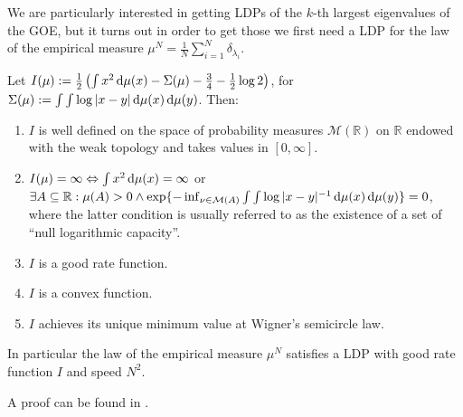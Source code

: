 We are particularly interested in getting LDPs of the $k$-th largest eigenvalues of the GOE, but it turns out in order to get those we first need a LDP for the law of the empirical measure $\mu^N=\frac{1}{N}\sum_{i=1}^N\delta_{\lambda_i}$.

\begin{theorem}\label{thm:LDPforWSCL}
	Let $I(\mu):=\frac{1}{2}\left(\int x^2\mathop{}\!\mathrm{d}\mu(x) - \Sigma(\mu) - \frac{3}{4}-\frac{1}{2}\log 2 \right)$, for $\Sigma(\mu):=\int\int\log|x-y|\mathop{}\!\mathrm{d}\mu(x)\mathop{}\!\mathrm{d}\mu(y)$. Then:
	\begin{enumerate}
		\item $I$ is well defined on the space of probability measures $\mathcal M(\mathbb{R})$ on $\mathbb{R}$ endowed with the weak topology and takes values in $[0,\infty]$.
		\item $I(\mu)=\infty \Leftrightarrow \int x^2\mathop{}\!\mathrm{d}\mu(x)=\infty$ or $\exists A\subseteq\mathbb R: \mu(A)>0 \land \exp\{-\inf_{\nu\in\mathcal M(A)}\int\int \log|x-y|^{-1}\mathop{}\!\mathrm{d}\mu(x)\mathop{}\!\mathrm{d}\mu(y)\}=0$, where the latter condition is usually referred to as the existence of a set of ``null logarithmic capacity''.
		\item $I$ is a good rate function.
		\item $I$ is a convex function.
		\item $I$ achieves its unique minimum value at Wigner's semicircle law.
	\end{enumerate}
	In particular the law of the empirical measure $\mu^N$ satisfies a LDP with good rate function $I$ and speed $N^2$.
\end{theorem}

A proof can be found in \cite{ArousLDPforWSL}.
	


